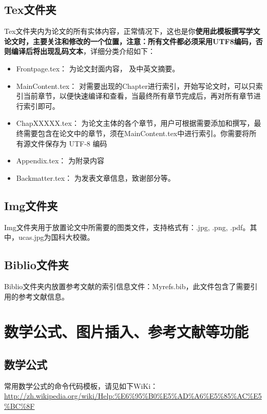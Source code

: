 \subsection{Tex文件夹}

Tex文件夹内为论文的所有实体内容，正常情况下，这也是你\textbf{使用此模板撰写学文论文时，主要关注和修改的一个位置，注意：所有文件都必须采用UTF8编码，否则编译后将出现乱码文本}，详细分类介绍如下：

\begin{itemize}
  \item Frontpage.tex： 为论文封面内容， 及中英文摘要。
  \item Main\textunderscore Content.tex： 对需要出现的Chapter进行索引，开始写论文时，可以只索引当前章节，以便快速编译和查看，当最终所有章节完成后，再对所有章节进行索引即可。
  \item Chap\textunderscore XXXXX.tex： 为论文主体的各个章节，用户可根据需要添加和撰写，最终需要包含在论文中的章节，须在Main\textunderscore Content.tex中进行索引。你需要将所有源文件保存为 UTF-8 编码
  \item Appendix.tex： 为附录内容
  \item Backmatter.tex： 为发表文章信息，致谢部分等。
\end{itemize}

\subsection{Img文件夹}

Img文件夹用于放置论文中所需要的图类文件，支持格式有：.jpg, .png, .pdf。其中，ucas.jpg为国科大校徽。

\subsection{Biblio文件夹}

Biblio文件夹内放置参考文献的索引信息文件：Myrefs.bib，此文件包含了需要引用的参考文献信息。

\section{数学公式、图片插入、参考文献等功能}

\subsection{数学公式}

常用数学公式的命令代码模板，请见如下WiKi：\url{http://zh.wikipedia.org/wiki/Help:%E6%95%B0%E5%AD%A6%E5%85%AC%E5%BC%8F}

